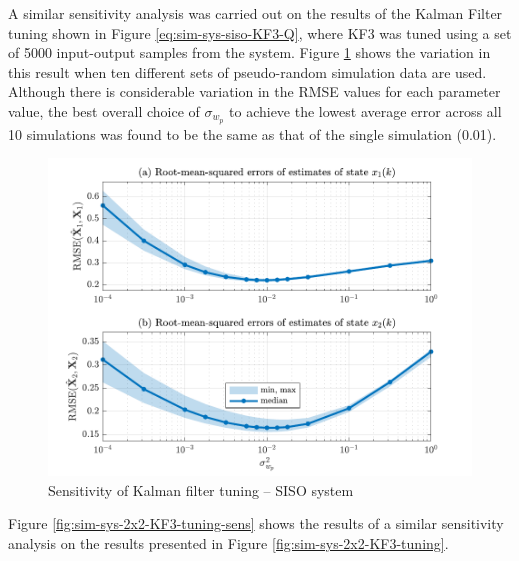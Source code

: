 {A similar sensitivity analysis was carried out on the results of the Kalman Filter tuning shown in Figure \ref{eq:sim-sys-siso-KF3-Q}, where KF3 was tuned using a set of 5000 input-output samples from the system. Figure \ref{fig:sim-sys-siso-KF3-sensitivity} shows the variation in this result when ten different sets of pseudo-random simulation data are used.  Although there is considerable variation in the \gls{RMSE} values for each parameter value, the best overall choice of $\sigma_{w_p}$ to achieve the lowest average error across all 10 simulations was found to be the same as that of the single simulation (0.01).

\begin{figure}[htp]
	\centering
	\includegraphics[width=14cm]{images/rod_obs_sim1_3KF_Q_statplot.pdf}
	\caption{Sensitivity of Kalman filter tuning – SISO system}
	\label{fig:sim-sys-siso-KF3-sensitivity}
\end{figure}

Figure \ref{fig:sim-sys-2x2-KF3-tuning-sens} shows the results of a similar sensitivity analysis on the results presented in Figure \ref{fig:sim-sys-2x2-KF3-tuning}.

}
